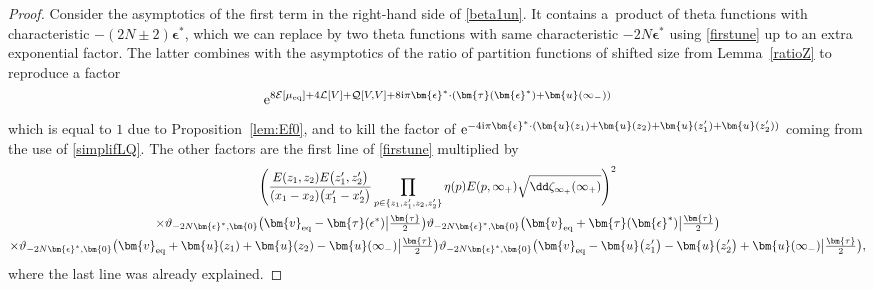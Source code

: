 \documentclass[pdftex]{sigma}
\numberwithin{equation}{section}
\begin{document}
\begin{proof}
Consider the asymptotics of the first term in the right-hand side of \eqref{beta1un}. It contains a~product of theta functions with characteristic $-(2N \pm 2)\bm{\epsilon}^*$, which we can replace by two theta functions with same characteristic $-2N\bm{\epsilon}^*$ using \eqref{firstune} up to an extra exponential factor. The latter combines with the asymptotics of the ratio of partition functions of shifted size from Lemma~\ref{ratioZ} to reproduce a factor
\[
{\rm e}^{8\mathcal{E}[\mu_{{\rm eq}}] + 4\mathcal{L}[V] + \mathcal{Q}[V,V] + 8{\rm i}\pi \bm{\epsilon}^* \cdot (\bm{\tau}(\bm{\epsilon}^*) + \bm{u}(\infty_-))}
\]
which is equal to $1$ due to Proposition~\ref{lem:Ef0}, and to kill the factor of ${\rm e}^{-4{\rm i}\pi \bm{\epsilon}^*\cdot(\bm{u}(z_1)+\bm{u}(z_2) + \bm{u}(z_1') + \bm{u}(z_2'))}$ coming from the use of \eqref{simplifLQ}. The other factors are the first line of \eqref{firstune} multiplied by
\begin{gather*}
 \Biggl(\frac{E(z_1,z_2)E\bigl(z_1',z_2'\bigr)}{(x_1 - x_2)\bigl(x_1' - x_2'\bigr)} \prod_{p \in \{z_1,z'_1,z_2,z_2'\}} \eta(p)E(p,\infty_+)\sqrt{\dd\zeta_{\infty_+}(\infty_+)}\Biggr)^2 \\
 \times \vartheta_{-2N\bm{\epsilon}^*,\bm{0}}\bigl(\bm{v}_{{\rm eq}} - \bm{\tau}(\epsilon^*)\big|\tfrac{\bm{\tau}}{2}\bigr) \vartheta_{-2N\bm{\epsilon}^*,\bm{0}}\bigl(\bm{v}_{{\rm eq}} + \bm{\tau}(\bm{\epsilon}^*)\big|\tfrac{\bm{\tau}}{2}\bigr) \\
 \times \vartheta_{-2N\bm{\epsilon}^*,\bm{0}}\bigl(\bm{v}_{{\rm eq}} + \bm{u}(z_1) + \bm{u}(z_2) - \bm{u}(\infty_-)\big|\tfrac{\bm{\tau}}{2}\bigr) \vartheta_{-2N\bm{\epsilon}^*,\bm{0}}\bigl(\bm{v}_{{\rm eq}} - \bm{u}\bigl(z_1'\bigr) - \bm{u}\bigl(z_2'\bigr) + \bm{u}(\infty_-)\big|\tfrac{\bm{\tau}}{2}\bigr),
\end{gather*}
where the last line was already explained.




\end{proof}
\end{document}
